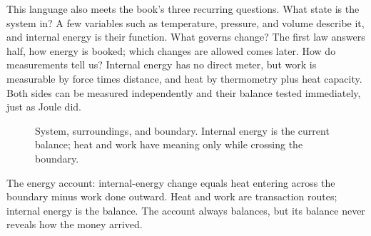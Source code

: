 \begin{mainline}
This language also meets the book's three recurring questions. What state is the system in? A few variables such as temperature, pressure, and volume describe it, and internal energy is their function. What governs change? The first law answers half, how energy is booked; which changes are allowed comes later. How do measurements tell us? Internal energy has no direct meter, but work is measurable by force times distance, and heat by thermometry plus heat capacity. Both sides can be measured independently and their balance tested immediately, just as Joule did.
\end{mainline}

\begin{figure}[htbp]
\centering
{}
\caption{System, surroundings, and boundary. Internal energy is the current balance; heat and work have meaning only while crossing the boundary.}
\end{figure}


\begin{oneline}
The energy account: internal-energy change equals heat entering across the boundary minus work done outward. Heat and work are transaction routes; internal energy is the balance. The account always balances, but its balance never reveals how the money arrived.
\end{oneline}



